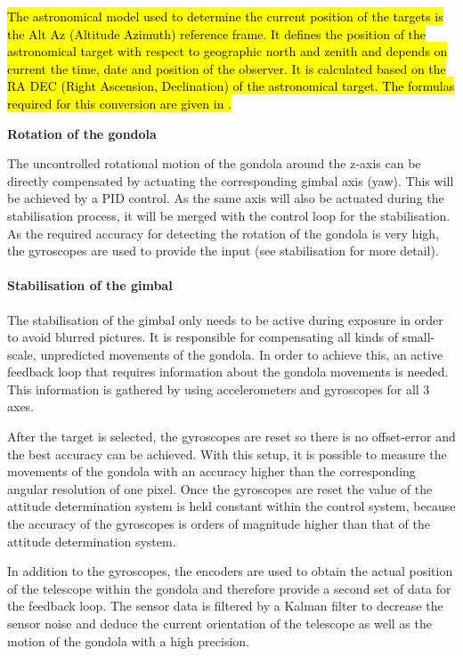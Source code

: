 \hl{The astronomical model used to determine the current position of the targets is the Alt Az (Altitude Azimuth) reference frame. It defines the position of the astronomical target with respect to geographic north and zenith and depends on current the time, date and position of the observer. It is calculated based on the RA DEC (Right Ascension, Declination) of the astronomical target. The formulas required for this conversion are given in \mbox{\cite{RaDec2AltAz}}.
}

\textbf{Rotation of the gondola}

The uncontrolled rotational motion of the gondola around the z-axis can be directly compensated by actuating the corresponding gimbal axis (yaw). This will be achieved by a PID control. As the same axis will also be actuated during the stabilisation process, it will be merged with the control loop for the stabilisation. As the required accuracy for detecting the rotation of the gondola is very high, the gyroscopes are used to provide the input (see stabilisation for more detail).


\paragraph{Stabilisation of the gimbal}
The stabilisation of the gimbal only needs to be active during exposure in order to avoid blurred pictures. It is responsible for compensating all kinds of small-scale, unpredicted movements of the gondola. In order to achieve this, an active feedback loop that requires information about the gondola movements is needed. This information is gathered by using accelerometers and gyroscopes for all 3 axes.

After the target is selected, the gyroscopes are reset so there is no offset-error and the best accuracy can be achieved. With this setup, it is possible to measure the movements of the gondola with an accuracy higher than the corresponding angular resolution of one pixel. Once the gyroscopes are reset the value of the attitude determination system is held constant within the control system, because the accuracy of the gyroscopes is orders of magnitude higher than that of the attitude determination system. 

In addition to the gyroscopes, the encoders are used to obtain the actual position of the telescope within the gondola and therefore provide a second set of data for the feedback loop. The sensor data is filtered by a Kalman filter to decrease the sensor noise and deduce the current orientation of the telescope as well as the motion of the gondola with a high precision.

